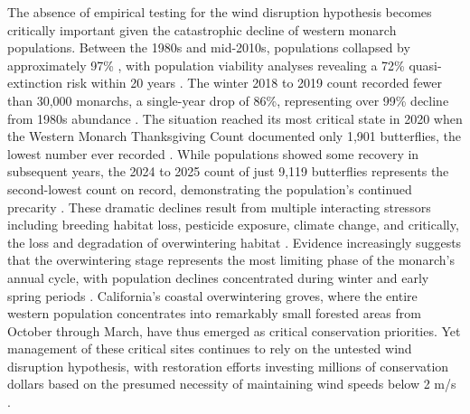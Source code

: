 The absence of empirical testing for the wind disruption hypothesis becomes critically important given the catastrophic decline of western monarch populations. Between the 1980s and mid-2010s, populations collapsed by approximately 97\% \parencite{schultzCitizenScienceMonitoring2017}, with population viability analyses revealing a 72\% quasi-extinction risk within 20 years \parencite{schultzCitizenScienceMonitoring2017}. The winter 2018 to 2019 count recorded fewer than 30,000 monarchs, a single-year drop of 86\%, representing over 99\% decline from 1980s abundance \parencite{peltonWesternMonarchPopulation2019}. The situation reached its most critical state in 2020 when the Western Monarch Thanksgiving Count documented only 1,901 butterflies, the lowest number ever recorded \parencite{xercessocietyWesternMonarchThanksgiving2025}. While populations showed some recovery in subsequent years, the 2024 to 2025 count of just 9,119 butterflies represents the second-lowest count on record, demonstrating the population's continued precarity \parencite{xercessocietyWesternMonarchThanksgiving2025}. These dramatic declines result from multiple interacting stressors including breeding habitat loss, pesticide exposure, climate change, and critically, the loss and degradation of overwintering habitat \parencite{croneWhyAreMonarch2019,peltonWesternMonarchPopulation2019}. Evidence increasingly suggests that the overwintering stage represents the most limiting phase of the monarch's annual cycle, with population declines concentrated during winter and early spring periods \parencite{peltonWesternMonarchPopulation2019,mariniDensitydependenceDecliningPopulation2017}. California's coastal overwintering groves, where the entire western population concentrates into remarkably small forested areas from October through March, have thus emerged as critical conservation priorities. Yet management of these critical sites continues to rely on the untested wind disruption hypothesis, with restoration efforts investing millions of conservation dollars based on the presumed necessity of maintaining wind speeds below 2 m/s \parencite{althouse&meadeinc.EllwoodMesaSperling2023,themonarchpressCityAwarded392019}.

